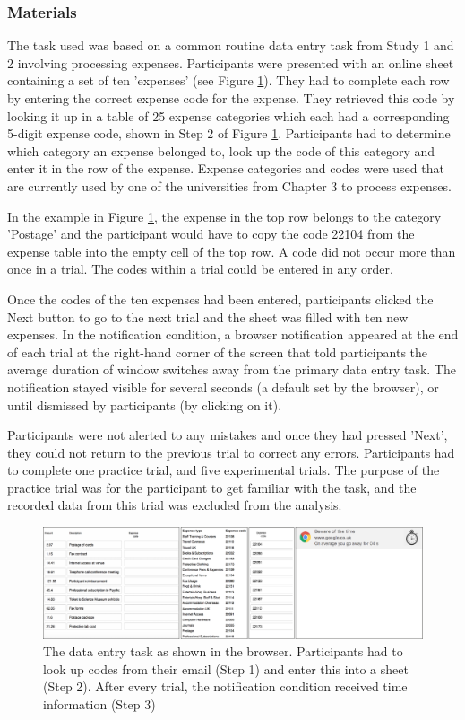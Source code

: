 \subsubsection{Materials}
The task used was based on a common routine data entry task from Study 1 and 2 involving processing expenses. Participants were presented with an online sheet containing a set of ten 'expenses' (see Figure \ref{fig:ch56-6_TaskInterface}). They had to complete each row by entering the correct expense code for the expense. They retrieved this code by looking it up in a table of 25 expense categories which each had a corresponding 5-digit expense code, shown in Step 2 of Figure \ref{fig:ch56-6_TaskInterface}. Participants had to determine which category an expense belonged to, look up the code of this category and enter it in the row of the expense.  Expense categories and codes were used that are currently used by one of the  universities from Chapter 3 to process expenses.

In the example in Figure \ref{fig:ch56-6_TaskInterface}, the expense in the top row belongs to the category 'Postage' and the participant would have to copy the code 22104 from the expense table into the empty cell of the top row. A code did not occur more than once in a trial. The codes within a trial could be entered in any order. 

Once the codes of the ten expenses had been entered, participants clicked the Next button to go to the next trial and the sheet was filled with ten new expenses. In the notification condition, a browser notification appeared at the end of each trial at the right-hand corner of the screen that told participants the average duration of window switches away from the primary data entry task. The notification stayed visible for several seconds (a default set by the browser), or until dismissed by participants (by clicking on it). 

Participants were not alerted to any mistakes and once they had pressed 'Next', they could not return to the previous trial to correct any errors. Participants had to complete one practice trial, and five experimental trials. The purpose of the practice trial was for the participant to get familiar with the task, and the recorded data from this trial was excluded from the analysis.

\begin{figure}
\centering
\includegraphics[width=\textwidth]{images/ch56/ch56-taskinterface.pdf}
\caption{The data entry task as shown in the browser. Participants had to look up codes from their email (Step 1) and enter this into a sheet (Step 2). After every trial, the notification condition received time information (Step 3)}
\label{fig:ch56-6_TaskInterface}
\end{figure}

